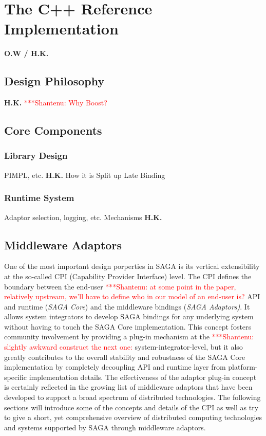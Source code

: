 \documentclass[a4paper,10pt]{article}
\newcommand{\jhanote}[1]{  {\textcolor{red}     { ***Shantenu: #1 }}}
\newcommand{\jhanote}[1]{}
\begin{document}
 \section{The C++ Reference Implementation}
 \textbf{O.W / H.K.}
 
 \subsection{Design Philosophy}
 \textbf{H.K.}
 \jhanote{Why Boost?}

 \subsection{Core Components}
 
 \subsubsection{Library Design}
 
 PIMPL, etc. \textbf{H.K.}
 How it is Split up
 Late Binding
 

 \subsubsection{Runtime System}
 Adaptor selection, logging, etc. Mechanisms  \textbf{H.K.}

 
\subsection{Middleware Adaptors}

 One of the most important design porperties in SAGA is its vertical
 extensibility at the so-called CPI (Capability Provider Interface)
 level.  The CPI defines the boundary between the end-user \jhanote{at
   some point in the paper, relatively upstream, we'll have to define
   who in our model of an end-user is?} API and runtime (\textit{SAGA
   Core}) and the middleware bindings (\textit{SAGA Adaptors)}.  It
 allows system integrators to develop SAGA bindings for any underlying
 system without having to touch the SAGA Core implementation.  This
 concept fosters community involvement by providing a plug-in
 mechanism at the \jhanote{slightly awkward construct the next one:}
 system-integrator-level, but it also greatly contributes to the
 overall stability and robustness of the SAGA Core implementation by
 completely decoupling API and runtime layer from platform-specific
 implementation details.  The effectiveness of the adaptor plug-in
 concept is certainly reflected in the growing list of middleware
 adaptors that have been developed to support a broad spectrum of
 distributed technologies. The following sections will introduce some
 of the concepts and details of the CPI as well as try to give a
 short, yet comprehensive overview of distributed computing
 technologies and systems supported by SAGA through middleware
 adaptors.
 
\end{document}
